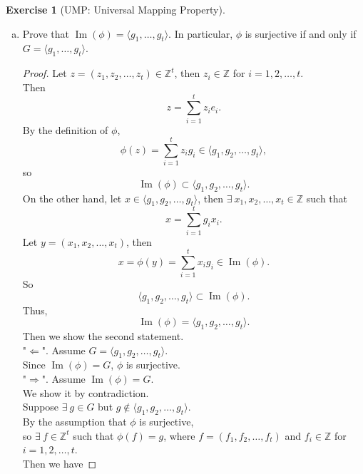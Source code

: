 \documentclass{article}
\newcommand{\bbz}{\mathbb{Z}}
\newcommand{\im}{\operatorname{Im}}
\theoremstyle{plain}
\theoremstyle{definition}
\newtheorem{exer}[lem]{Exercise}
\begin{document}
\begin{exer}[UMP: Universal Mapping Property]
\begin{enumerate}[(a)]
\begin{proof}
  Let $z = (z_1,z_2,\ldots,z_t) \in \bbz^t$, then $z_i \in \bbz$ for $i=1,2,\ldots,t$.\\
  Then
  \[z = \sum_{i=1}^{t}z_ie_i.\]
  Since $\phi$ and $\varphi$ are homomorphisms,
  \begin{align*} 
  	\phi (z) &=\sum_{i=1}^tz_ig_i \\
  			 &=\sum_{i=1}^tz_i\varphi(e_i) \\
  			 &=\sum_{i=1}^t\varphi(z_ie_i) \\
			 &= \varphi(z)
  \end{align*}
  Since $z \in \bbz ^t$ is arbitrary, $\phi = \varphi$.\\
  Thus, such abelian group homomorphism is unique.

\end{proof}
\item 
Prove that $\im(\phi)=\langle g_1,\ldots,g_t\rangle$.
In particular, $\phi$ is surjective if and only if $G=\langle g_1,\ldots,g_t\rangle$.
\begin{proof}
  Let $z = (z_1,z_2,\ldots,z_t) \in \bbz^t$, then $z_i \in \bbz$ for $i=1,2,\ldots,t$. \\
  Then
    \[z = \sum_{i=1}^{t}z_ie_i.\]
  By the definition of $\phi$,
  	\[ \phi (z) = \sum_{i=1}^tz_ig_i \in \langle g_1,g_2,\ldots,g_t\rangle, \]    
  	so 
  	\[ \im(\phi) \subset \langle g_1,g_2,\ldots,g_t\rangle.\]
  	On the other hand, let $x \in \langle g_1,g_2,\ldots,g_t\rangle$, then $\exists\ x_1, x_2,\ldots,x_t \in \bbz$ such that 
  	\[x = \sum_{i=1}^tg_i{x_i}.\]
	Let $y= (x_1,x_2,...,x_t)$, then 
	\[x=\phi (y) = \sum_{i=1}^{t}x_i g_i \in \im(\phi). \]
	So
	\[\langle g_1,g_2,\ldots,g_t\rangle \subset \im(\phi).\]
	Thus,
	\[ \im(\phi) = \langle g_1,g_2,\ldots,g_t\rangle.\]
	Then we show the second statement.\\
	"$\Leftarrow$". Assume $G= \langle g_1,g_2,\ldots,g_t\rangle $.\\
	Since $\im(\phi) = G$, $\phi$ is surjective.\\
  	"$\Rightarrow$". Assume $\im(\phi) = G$.\\
	We show it by contradiction.\\
	Suppose $\exists \ g \in G$ but $g \not\in \langle g_1,g_2,\ldots,g_t\rangle$. \\
	By the assumption that $\phi$ is surjective, \\
	so $\exists \ f \in \bbz^t$ such that $\phi(f) = g$, where $f=(f_1,f_2,\ldots,f_t)$ and $f_i \in \bbz$ for $i=1,2,\ldots,t$.\\
	Then we have

\end{proof}
\end{enumerate}
\end{exer}
\end{document}
